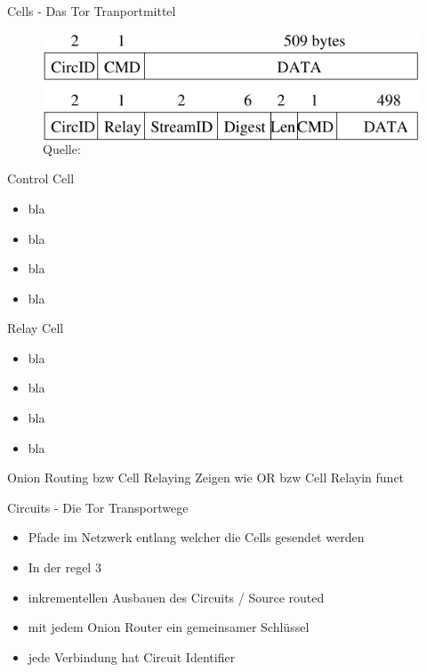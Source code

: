 \documentclass{beamer}
\begin{document}
\begin{frame}{Cells - Das Tor Tranportmittel}
 
\begin{figure}
  \begin{columns}[c]
      \includegraphics[width=\textwidth]{pics/cell}
      \caption{Quelle: \cite{tor}}
  \end{columns}
\end{figure}
  
  {
    \begin{block}{Control Cell}
      \begin{itemize}
	\item bla
	\item bla
	\item bla
	\item bla
      \end{itemize}
    \end{block} 
  }
  {
    \begin{block}{Relay Cell}
      \begin{itemize}
	\item bla
	\item bla
	\item bla
	\item bla
      \end{itemize}
    \end{block} 
  }
\end{frame}

\begin{frame}{Onion Routing bzw Cell Relaying}
Zeigen wie OR bzw Cell Relayin funct
\end{frame}

\begin{frame}{Circuits - Die Tor Transportwege}
      \begin{itemize}
	\item Pfade im Netzwerk entlang welcher die Cells gesendet werden
	\item In der regel 3
	\item inkrementellen Ausbauen des Circuits / Source routed
	\item mit jedem Onion Router ein gemeinsamer Schlüssel
	\item jede Verbindung hat Circuit Identifier
      \end{itemize}
\end{frame}
\end{document}
